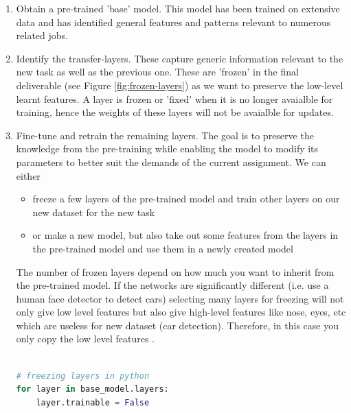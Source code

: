 \documentclass[11pt]{article}
\begin{document}
\begin{enumerate}
    \item Obtain a pre-trained 'base' model. This model has been trained on extensive data and has identified general features and patterns relevant to numerous related jobs.
    \item Identify the transfer-layers. These capture generic information relevant to the new task as well as the previous one. These are 'frozen' in the final deliverable (see Figure \ref{fig:frozen-layers}) as we want to preserve the low-level learnt features. A layer is frozen or 'fixed' when it is no longer avaialble for training, hence the weights of these layers will not be avaialble for updates.
    \item Fine-tune and retrain the remaining layers. The goal is to preserve the knowledge from the pre-training while enabling the model to modify its parameters to better suit the demands of the current assignment. We can either
          \begin{itemize}
              \item freeze a few layers of the pre-trained model and train other layers on our new dataset for the new task
              \item or make a new model, but also take out some features from the layers in the pre-trained model and use them in a newly created model
          \end{itemize}
    The number of frozen layers depend on how much you want to inherit from the pre-trained model. If the networks are significantly different (i.e. use a human face detector to detect cars) selecting many layers for freezing will not only give low level features but also give high-level features like nose, eyes, etc which are useless for new dataset (car detection). Therefore, in this case you only copy the low level features \cite{geeks-transfer-learning}.

    \begin{lstlisting}[language=python] 
        
# freezing layers in python
for layer in base_model.layers: 
    layer.trainable = False

    \end{lstlisting}
\end{enumerate}
\end{document}

